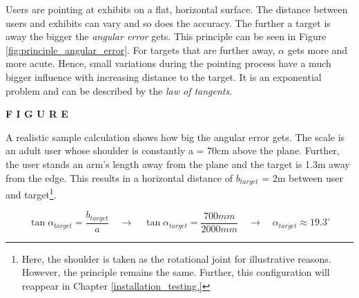 
Users are pointing at exhibits on a flat, horizontal surface. The distance between users and exhibits can vary and so does the accuracy. The further a target is away the bigger the \textit{angular error} gets. This principle can be seen in Figure \ref{fig:principle_angular_error}. For targets that are further away, $\alpha$ gets more and more acute. Hence, small variations during the pointing process have a much bigger influence with increasing distance to the target. It is an exponential problem and can be described by the \textit{law of tangents}. 

\textbf{F I G U R E}

A realistic sample calculation shows how big the angular error gets. The scale is an adult user whose shoulder is constantly a = 70cm above the plane. Further, the user stands an arm's length away from the plane and the target is 1.3m away from the edge. This results in a horizontal distance of $b_{target}$ = 2m between user and target\footnote{Here, the shoulder is taken as the rotational joint for illustrative reasons. However, the principle remains the same. Further, this configuration will reappear in Chapter \ref{installation_testing.}}.

$$\tan{\alpha_{target}} = \frac{b_{target}}{a} \quad \to \quad \tan{\alpha_{target}} = \frac{700mm}{2000mm} \quad \to \quad \alpha_{target} \approx 19.3^\circ$$

